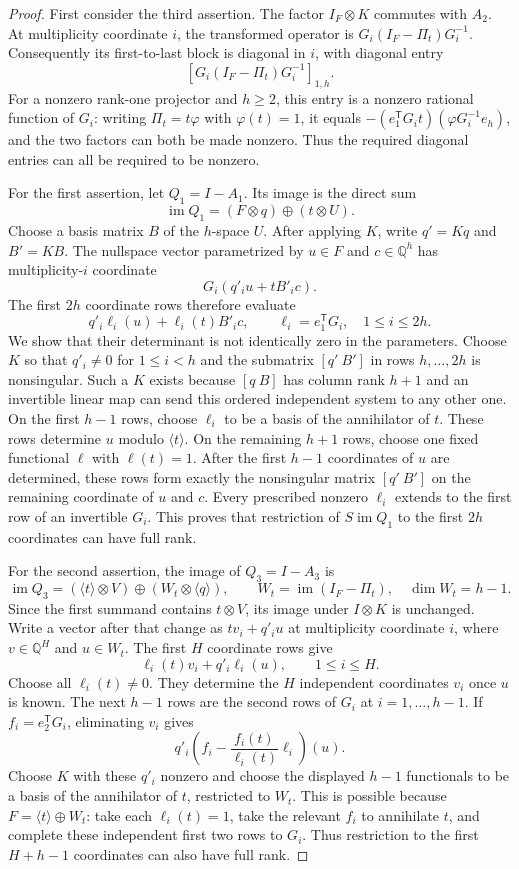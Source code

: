 \begin{proof}
First consider the third assertion. The factor $I_F\otimes K$ commutes
with $A_2$. At multiplicity coordinate $i$, the transformed operator is
$G_i(I_F-\Pi_t)G_i^{-1}$. Consequently its first-to-last block is diagonal
in $i$, with diagonal entry
\[
 [G_i(I_F-\Pi_t)G_i^{-1}]_{1,h}.
\]
For a nonzero rank-one projector and $h\ge2$, this entry is a nonzero
rational function of $G_i$: writing $\Pi_t=t\varphi$ with $\varphi(t)=1$,
it equals $-(e_1^{\mathsf T}G_it)(\varphi G_i^{-1}e_h)$, and the two
factors can both be made nonzero. Thus the required diagonal entries can
all be required to be nonzero.

For the first assertion, let $Q_1=I-A_1$. Its image is the direct sum
\[
 \operatorname{im}Q_1=(F\otimes q)\oplus(t\otimes U).
\]
Choose a basis matrix $B$ of the $h$-space $U$. After applying $K$, write
$q'=Kq$ and $B'=KB$. The nullspace vector parametrized by $u\in F$ and
$c\in\mathbb Q^h$ has multiplicity-$i$ coordinate
\[
 G_i(q'_i u+tB'_i c).
\]
The first $2h$ coordinate rows therefore evaluate
\[
 q'_i\ell_i(u)+\ell_i(t)B'_i c,
 \qquad \ell_i=e_1^{\mathsf T}G_i,\quad 1\le i\le2h.
\]
We show that their determinant is not identically zero in the parameters.
Choose $K$ so that $q'_i\ne0$ for $1\le i<h$ and the submatrix
$[q'\ B']$ in rows $h,\ldots,2h$ is nonsingular. Such a $K$ exists because
$[q\ B]$ has column rank $h+1$ and an invertible linear map can send this
ordered independent system to any other one. On the first $h-1$ rows,
choose $\ell_i$ to be a basis of the annihilator of $t$. These rows
determine $u$ modulo $\langle t\rangle$. On the remaining $h+1$ rows,
choose one fixed functional $\ell$ with $\ell(t)=1$. After the first
$h-1$ coordinates of $u$ are determined, these rows form exactly the
nonsingular matrix $[q'\ B']$ on the remaining coordinate of $u$ and $c$.
Every prescribed nonzero $\ell_i$ extends to the first row of an invertible
$G_i$. This proves that restriction of $S\operatorname{im}Q_1$ to the
first $2h$ coordinates can have full rank.

For the second assertion, the image of $Q_3=I-A_3$ is
\[
 \operatorname{im}Q_3=(\langle t\rangle\otimes V)
          \oplus(W_t\otimes\langle q\rangle),
 \qquad W_t=\operatorname{im}(I_F-\Pi_t),\quad\dim W_t=h-1.
\]
Since the first summand contains $t\otimes V$, its image under $I\otimes K$
is unchanged. Write a vector after that change as
$t v_i+q'_i u$ at multiplicity coordinate $i$, where $v\in\mathbb Q^H$
and $u\in W_t$. The first $H$ coordinate rows give
\[
 \ell_i(t)v_i+q'_i\ell_i(u),\qquad 1\le i\le H.
\]
Choose all $\ell_i(t)\ne0$. They determine the $H$ independent coordinates
$v_i$ once $u$ is known. The next $h-1$ rows are the second rows of
$G_i$ at $i=1,\ldots,h-1$. If $f_i=e_2^{\mathsf T}G_i$, eliminating
$v_i$ gives
\[
 q'_i\left(f_i-\frac{f_i(t)}{\ell_i(t)}\ell_i\right)(u).
\]
Choose $K$ with these $q'_i$ nonzero and choose the displayed $h-1$
functionals to be a basis of the annihilator of $t$, restricted to $W_t$.
This is possible because $F=\langle t\rangle\oplus W_t$: take each
$\ell_i(t)=1$, take the relevant $f_i$ to annihilate $t$, and complete
these independent first two rows to $G_i$. Thus restriction to the
first $H+h-1$ coordinates can also have full rank.


\end{proof}
